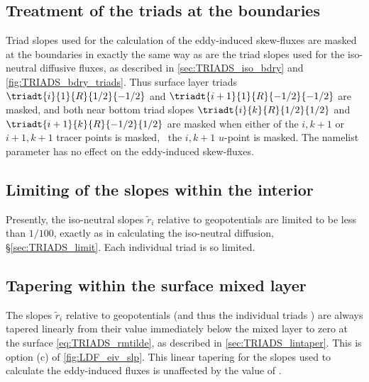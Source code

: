 \documentclass[../main/NEMO_manual]{subfiles}
\begin{document}
\subsection{Treatment of the triads at the boundaries}
\label{sec:TRIADS_skew_bdry}

Triad slopes  used for the calculation of the eddy-induced skew-fluxes are masked at the boundaries
in exactly the same way as are the triad slopes  used for the iso-neutral diffusive fluxes,
as described in \autoref{sec:TRIADS_iso_bdry} and \autoref{fig:TRIADS_bdry_triads}.
Thus surface layer triads $\triadt{i}{1}{R}{1/2}{-1/2}$ and $\triadt{i+1}{1}{R}{-1/2}{-1/2}$ are masked,
and both near bottom triad slopes $\triadt{i}{k}{R}{1/2}{1/2}$ and $\triadt{i+1}{k}{R}{-1/2}{1/2}$ are masked when
either of the $i,k+1$ or $i+1,k+1$ tracer points is masked, \ie\ the $i,k+1$ $u$-point is masked.
The namelist parameter  has no effect on the eddy-induced skew-fluxes.

\subsection{Limiting of the slopes within the interior}
\label{sec:TRIADS_limitskew}

Presently, the iso-neutral slopes $\tilde{r}_i$ relative to geopotentials are limited to be less than $1/100$,
exactly as in calculating the iso-neutral diffusion, \S \autoref{sec:TRIADS_limit}.
Each individual triad  is so limited.

\subsection{Tapering within the surface mixed layer}
\label{sec:TRIADS_taperskew}

The slopes $\tilde{r}_i$ relative to geopotentials (and thus the individual triads )
are always tapered linearly from their value immediately below the mixed layer to zero at the surface
\autoref{eq:TRIADS_rmtilde}, as described in \autoref{sec:TRIADS_lintaper}.
This is option (c) of \autoref{fig:LDF_eiv_slp}.
This linear tapering for the slopes used to calculate the eddy-induced fluxes is unaffected by
the value of .
\end{document}
